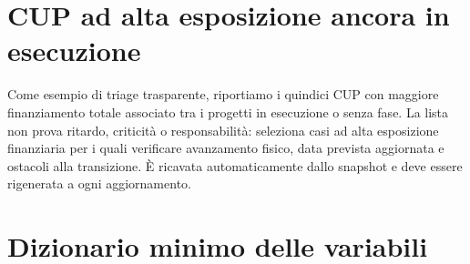 \documentclass[10pt,a4paper]{article}
\begin{document}
\clearpage
\section{CUP ad alta esposizione ancora in esecuzione}

Come esempio di triage trasparente, riportiamo i quindici CUP con maggiore finanziamento totale associato tra i progetti in esecuzione o senza fase. La lista non prova ritardo, criticità o responsabilità: seleziona casi ad alta esposizione finanziaria per i quali verificare avanzamento fisico, data prevista aggiornata e ostacoli alla transizione. È ricavata automaticamente dallo snapshot e deve essere rigenerata a ogni aggiornamento.

\begin{table}[H]
\centering
\caption{Esempio di lista di monitoraggio ad alta esposizione}
\resizebox{\textwidth}{!}{}
\end{table}

\section{Dizionario minimo delle variabili}
\end{document}
